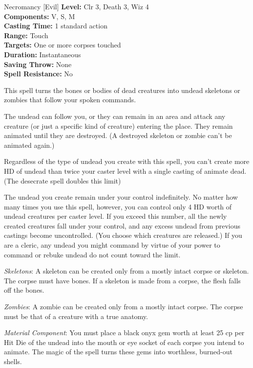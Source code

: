 {Necromancy [Evil]}
{
	\textbf{Level:}
	Clr 3, Death 3, Wiz 4\\
	\textbf{Components:}
	V, S, M\\
	\textbf{Casting Time:}
	1 standard action\\
	\textbf{Range:}
	Touch\\
	\textbf{Targets:}
	One or more corpses touched\\
	\textbf{Duration:}
	Instantaneous\\
	\textbf{Saving Throw:}
	None\\
	\textbf{Spell Resistance:}
	No\\
}
{
	This spell turns the bones or bodies of dead creatures into undead skeletons or zombies that follow your spoken commands.

	The undead can follow you, or they can remain in an area and attack any creature (or just a specific kind of creature) entering the place. They remain animated until they are destroyed. (A destroyed skeleton or zombie can't be animated again.)

	Regardless of the type of undead you create with this spell, you can't create more HD of undead than twice your caster level with a single casting of animate dead. (The desecrate spell doubles this limit)

	The undead you create remain under your control indefinitely. No matter how many times you use this spell, however, you can control only 4 HD worth of undead creatures per caster level. If you exceed this number, all the newly created creatures fall under your control, and any excess undead from previous castings become uncontrolled. (You choose which creatures are released.) If you are a cleric, any undead you might command by virtue of your power to command or rebuke undead do not count toward the limit.

	\textit{Skeletons}:
	A skeleton can be created only from a mostly intact corpse or skeleton. The corpse must have bones. If a skeleton is made from a corpse, the flesh falls off the bones.

	\textit{Zombies}:
	A zombie can be created only from a mostly intact corpse. The corpse must be that of a creature with a true anatomy.

	\textit{Material Component}:
	You must place a black onyx gem worth at least 25 cp per Hit Die of the undead into the mouth or eye socket of each corpse you intend to animate. The magic of the spell turns these gems into worthless, burned-out shells.

}
